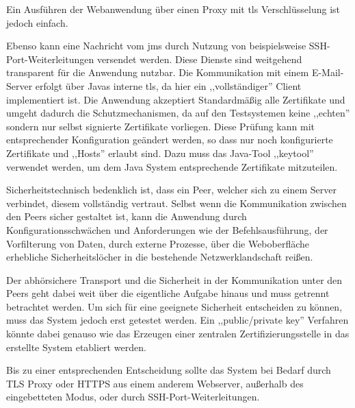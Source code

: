 \documentclass[oneside, ngerman, toc=bibliography,bibliography=totoc,listof=entryprefix, open=right,numbers=noenddot,fontsize=12pt]{scrbook}
\begin{document}
Ein Ausführen der Webanwendung über einen Proxy mit \acrfull{tls} Verschlüsselung ist jedoch einfach.

Ebenso kann eine Nachricht vom \acrshort{jms} durch Nutzung von beispielsweise SSH-Port-Weiterleitungen versendet werden. Diese Dienste sind weitgehend transparent für die Anwendung nutzbar.
Die Kommunikation mit einem E-Mail-Server erfolgt über Javas interne \acrshort{tls},  da hier ein ,,vollständiger'' Client implementiert ist. Die Anwendung akzeptiert Standardmäßig alle Zertifikate und umgeht dadurch die Schutzmechanismen, da auf den Testsystemen keine ,,echten'' sondern nur selbst signierte Zertifikate vorliegen.
Diese Prüfung kann mit entsprechender Konfiguration geändert werden, so dass nur noch konfigurierte Zertifikate und ,,Hosts'' erlaubt sind. Dazu muss das Java-Tool ,,keytool'' verwendet werden, um dem Java System entsprechende Zertifikate mitzuteilen.

Sicherheitstechnisch bedenklich ist, dass ein Peer, welcher sich zu einem Server verbindet, diesem vollständig vertraut.
Selbst wenn die Kommunikation zwischen den Peers sicher gestaltet ist, kann die Anwendung durch Konfigurationsschwächen und Anforderungen wie der Befehlsausführung, der Vorfilterung von Daten, durch externe Prozesse, über die  Weboberfläche erhebliche Sicherheitslöcher in die bestehende Netzwerklandschaft reißen.

Der abhörsichere Transport und die Sicherheit in der Kommunikation unter den Peers geht dabei weit über die eigentliche Aufgabe hinaus und muss getrennt betrachtet werden. Um sich für eine geeignete Sicherheit entscheiden zu können, muss das System jedoch erst getestet werden. Ein ,,public/private key'' Verfahren könnte dabei genauso wie das Erzeugen einer zentralen Zertifizierungsstelle in das erstellte System etabliert werden.

Bis zu einer entsprechenden Entscheidung sollte das System bei Bedarf durch TLS Proxy oder HTTPS aus einem anderem Webserver, außerhalb des eingebetteten Modus, oder durch SSH-Port-Weiterleitungen.


 
\end{document}

